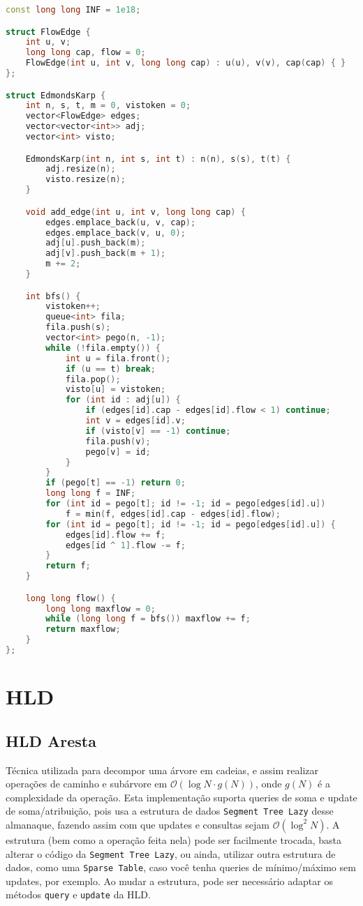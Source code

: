 \documentclass[10pt, a4paper, oneside]{book}
\begin{document}
\begin{lstlisting}[language=C++]
const long long INF = 1e18;

struct FlowEdge {
    int u, v;
    long long cap, flow = 0;
    FlowEdge(int u, int v, long long cap) : u(u), v(v), cap(cap) { }
};

struct EdmondsKarp {
    int n, s, t, m = 0, vistoken = 0;
    vector<FlowEdge> edges;
    vector<vector<int>> adj;
    vector<int> visto;

    EdmondsKarp(int n, int s, int t) : n(n), s(s), t(t) {
        adj.resize(n);
        visto.resize(n);
    }

    void add_edge(int u, int v, long long cap) {
        edges.emplace_back(u, v, cap);
        edges.emplace_back(v, u, 0);
        adj[u].push_back(m);
        adj[v].push_back(m + 1);
        m += 2;
    }

    int bfs() {
        vistoken++;
        queue<int> fila;
        fila.push(s);
        vector<int> pego(n, -1);
        while (!fila.empty()) {
            int u = fila.front();
            if (u == t) break;
            fila.pop();
            visto[u] = vistoken;
            for (int id : adj[u]) {
                if (edges[id].cap - edges[id].flow < 1) continue;
                int v = edges[id].v;
                if (visto[v] == -1) continue;
                fila.push(v);
                pego[v] = id;
            }
        }
        if (pego[t] == -1) return 0;
        long long f = INF;
        for (int id = pego[t]; id != -1; id = pego[edges[id].u])
            f = min(f, edges[id].cap - edges[id].flow);
        for (int id = pego[t]; id != -1; id = pego[edges[id].u]) {
            edges[id].flow += f;
            edges[id ^ 1].flow -= f;
        }
        return f;
    }

    long long flow() {
        long long maxflow = 0;
        while (long long f = bfs()) maxflow += f;
        return maxflow;
    }
};
\end{lstlisting}
\hfill

\section{HLD}
\subsection{HLD Aresta}


Técnica utilizada para decompor uma árvore em cadeias, e assim realizar operações de caminho e subárvore em $\mathcal{O}(\log N \cdot g(N))$, onde $g(N)$ é a complexidade da operação. Esta implementação suporta queries de soma e update de soma/atribuição, pois usa a estrutura de dados \texttt{Segment Tree Lazy} desse almanaque, fazendo assim com que updates e consultas sejam  $\mathcal{O}(\log^2 N)$. A estrutura (bem como a operação feita nela) pode ser facilmente trocada, basta alterar o código da \texttt{Segment Tree Lazy}, ou ainda, utilizar outra estrutura de dados, como uma \texttt{Sparse Table}, caso você tenha queries de mínimo/máximo sem updates, por exemplo. Ao mudar a estrutura, pode ser necessário adaptar os métodos \texttt{query} e \texttt{update} da HLD.
\end{document}
